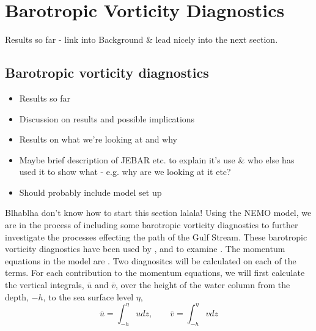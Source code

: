 \documentclass[..\EOYR.tex]{subfiles}
\begin{document}
\section{Barotropic Vorticity Diagnostics}

Results so far - link into Background \& lead nicely into the next section.
\subsection{Barotropic vorticity diagnostics}
\begin{itemize}
  \item Results so far
  \item Discussion on results and possible implications
  \item Results on what we're looking at and why
  \item Maybe brief description of JEBAR etc. to explain it's use \& who else has used it to show what - e.g. why are we looking at it etc?
  \item Should probably include model set up
\end{itemize}

Blhablha don't know how to start this section lalala!
Using the NEMO model, we are in the process of including some barotropic vorticity diagnostics to further investigate the processes effecting the path of the Gulf Stream. These barotropic vorticity diagnostics have been used by \citep{Bell1991},\citep{Gula???} and  to examine . The momentum equations in the model are . Two diagnositcs will be calculated on each of the  terms. 
For each contribution to the momentum equations, we will first calculate the vertical integrals, $\bar{u}$ and $\bar{v}$, over the height of the water column from the depth, $-h$, to the sea surface level $\eta$,
\begin{equation}
	\bar{u} = \int_{-h}^{\eta} u dz ,\qquad \bar{v} = \int_{-h}^{\eta} v dz 
\end {equation}
\end{document}
